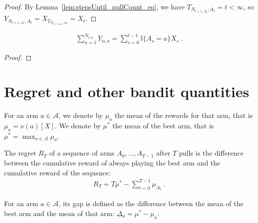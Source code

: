 \begin{proof}\leanok
By Lemma~\ref{lem:stepsUntil_pullCount_eq}, we have $T_{N_{t+1,A_t}, A_t} = t < \infty$, so $Y_{N_{t+1,A_t}, A_t} = X_{T_{N_{t+1,A_t}, A_t}} = X_t$.

\end{proof}


\begin{lemma}\label{lem:sum_rewardByCount}
  \leanok
\begin{align*}
  \sum_{n=1}^{N_{t, a}} Y_{n, a} = \sum_{s=0}^{t-1} \mathbb{I}\{A_s = a\} X_s
  \: .
\end{align*}
\end{lemma}

\begin{proof}\leanok

\end{proof}



\section{Regret and other bandit quantities}

\begin{definition}\label{def:armMean}
  \leanok %
For an arm $a \in \mathcal{A}$, we denote by $\mu_a$ the mean of the rewards for that arm, that is $\mu_a = \nu(a)[X]$.
We denote by $\mu^*$ the mean of the best arm, that is $\mu^* = \max_{a \in \mathcal{A}} \mu_a$.
\end{definition}


\begin{definition}[Regret]\label{def:regret}
  \leanok
The regret $R_T$ of a sequence of arms $A_0, \ldots, A_{T-1}$ after $T$ pulls is the difference between the cumulative reward of always playing the best arm and the cumulative reward of the sequence:
\begin{align*}
  R_T = T \mu^* - \sum_{t=0}^{T-1} \mu_{A_t} \: .
\end{align*}
\end{definition}


\begin{definition}\label{def:gap}
  \leanok
For an arm $a \in \mathcal{A}$, its gap is defined as the difference between the mean of the best arm and the mean of that arm: $\Delta_a = \mu^* - \mu_a$.
\end{definition}


